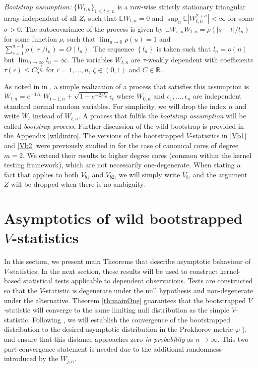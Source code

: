 \documentclass{article}
\newcommand{\ev}{\mathbb{E}}
\begin{document}
\emph{Bootstrap assumption:} $\{W_{t,n}\}_{1 \leq t \leq n }$ is a row-wise strictly stationary triangular array independent of all $Z_t$ such that $\ev W_{t,n}=0$ and $\sup_{n} \ev|W_{t,n}^{2+\sigma}| < \infty$ for some $\sigma > 0$. The autocovariance of the process is given by $\ev W_{s,n} W_{t,n}=\rho(|s-t|/l_n)$ for some function $\rho$, such that $\lim_{u \to 0} \rho(u) = 1$ and $\sum_{r=1}^{n-1} \rho(|r|/l_n)= O(l_n)$. The sequence $\left\{l_n\right\}$ is taken such that $l_n=o(n)$ but $\lim_{n \to \infty} l_n = \infty$. The variables $W_{t,n}$  are $\tau$-weakly dependent with coefficients $\tau(r) \leq C \zeta^{\frac{r} {l_n}}$ for $r=1,...,n$, $\zeta \in (0,1)$ and $C\in\mathbb R$.

As noted in in \cite[Remark 2]{leucht_dependent_2013}, a simple realization of a process that satisfies this assumption is $W_{t,n} = e^{-1/l_n}W_{t-1,n} + \sqrt{1 -e^{-2/l_n}} \epsilon_t$
where $W_{0,n}$ and $\epsilon_1,\ldots,\epsilon_n$ are independent standard normal random variables. For simplicity, we will drop the index $n$ and write $W_t$ instead of $W_{t,n}$. A process that fulfils the \emph{bootstrap assumption} will be called  \emph{bootstrap process}. Further discussion of the wild bootstrap is provided in the Appendix  \ref{wildintro}.
The versions of the bootstrapped $V$-statistics in \eqref{Vb1} and \eqref{Vb2} were previously studied in \cite{leucht_dependent_2013} for the case of canonical cores of degree $m=2$. We extend their results to higher degree cores (common within the kernel testing framework), which are not necessarily one-degenerate. When stating a fact that applies to both $V_{b1}$ and $V_{b2}$, we will simply write $V_b$, and the argument $Z$ will be dropped when there is no ambiguity. 
\section{Asymptotics of wild bootstrapped $V$-statistics}\label{sec:main}
In this section, we present main Theorems that describe asymptotic behaviour of $V$-statistics. In the next section, these results will be used to construct kernel-based statistical tests applicable to dependent observations. Tests are constructed so that the  $V$-statistic is degenerate under the null hypothesis and non-degenerate under the alternative. Theorem \ref{th:mainOne} guarantees that the bootstrapped $V$-statistic will converge to the same limiting null distribution as the simple $V$-statistic. Following \cite{leucht_dependent_2013}, we will establish the convergence of the bootstrapped distribution to the desired asymptotic distribution in the Prokhorov metric $\varphi$ \cite[Section 11.3]{dudley2002real}), and ensure that this distance approaches zero \emph{in probability} as $n\rightarrow\infty$. This two-part convergence statement is needed due to  the additional randomness introduced by the $W_{j,n}$.
\end{document}
